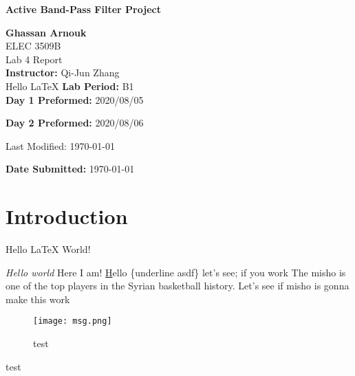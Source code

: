 \documentclass[hidelinks]{article}
\begin{document}
	\begin{titlepage}
		\begin{center}
			\vspace{1cm}
			{\LARGE\textbf{Active Band-Pass Filter Project}}

			\vspace{1.5cm}
			\textbf{\large Ghassan Arnouk}\\

			\vspace{1cm}
			\large ELEC 3509B\\
			\large Lab 4 Report\\


			\vspace{2cm}
			\textbf{Instructor:} Qi-Jun Zhang\\

            Hello \LaTeX
			\vspace{1cm}
			\textbf{Lab Period:} B1\\

			\vspace{0.1cm}
			\textbf{Day 1 Preformed:} 2020/08/05

			\vspace{0.1cm}
			\textbf{Day 2 Preformed:} 2020/08/06

            Last Modified: \today

			\vspace{1cm}
			\textbf{Date Submitted:} \today\\
		\end{center}
	\end{titlepage}

	\pagebreak




	\section{Introduction}
    Hello {\LaTeX} World!

    \emph{Hello world} Here I am!
    \underline Hello \{underline asdf\} let's see; if you work
    The \Gls{misho} is one of the top players in the Syrian basketball history.
    Let's see if \gls{misho} is gonna make this work

    \clearpage
	\begin{figure}[htbp]
		\centering
		\texttt{[image: msg.png]}
		\caption{test}
		\label{fig:test}
	\end{figure}
	test

  \printglossary
\end{document}
